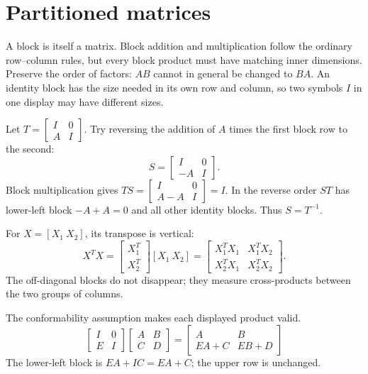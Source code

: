 \section{Partitioned matrices}
A block is itself a matrix. Block addition and multiplication follow the
ordinary row--column rules, but every block product must have matching
inner dimensions. Preserve the order of factors: $AB$ cannot in general
be changed to $BA$. An identity block has the size needed in its own row
and column, so two symbols $I$ in one display may have different sizes.

Let $T=\begin{bmatrix}I&0\\A&I\end{bmatrix}$. Try reversing the addition
of $A$ times the first block row to the second:
\[S=\begin{bmatrix}I&0\\-A&I\end{bmatrix}.\]
Block multiplication gives $TS=\begin{bmatrix}I&0\\A-A&I\end{bmatrix}=I$.
In the reverse order $ST$ has lower-left block $-A+A=0$ and all
other identity blocks. Thus $S=T^{-1}$.

For $X=[X_1\ X_2]$, its transpose is vertical:
\[X^TX=\begin{bmatrix}X_1^T\\X_2^T\end{bmatrix}[X_1\ X_2]
=\begin{bmatrix}X_1^TX_1&X_1^TX_2\\X_2^TX_1&X_2^TX_2\end{bmatrix}.\]
The off-diagonal blocks do not disappear; they measure cross-products
between the two groups of columns.

The conformability assumption makes each displayed product valid.
\[\begin{bmatrix}I&0\\E&I\end{bmatrix}\begin{bmatrix}A&B\\C&D\end{bmatrix}=\begin{bmatrix}A&B\\EA+C&EB+D\end{bmatrix}\]
The lower-left block is $EA+IC=EA+C$; the upper row is unchanged.

